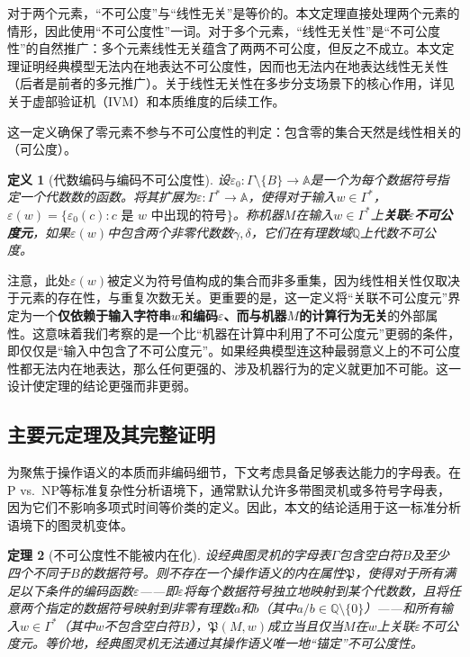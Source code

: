 \documentclass{ctexart}
\newtheorem{theorem}{定理}[section]
\newtheorem{definition}[theorem]{定义}
\begin{document}
	对于两个元素，``不可公度''与``线性无关''是等价的。本文定理直接处理两个元素的情形，因此使用``不可公度性''一词。对于多个元素，``线性无关性''是``不可公度性''的自然推广：多个元素线性无关蕴含了两两不可公度，但反之不成立。本文定理证明经典模型无法内在地表达不可公度性，因而也无法内在地表达线性无关性（后者是前者的多元推广）。关于线性无关性在多步分支场景下的核心作用，详见关于虚部验证机（IVM）和本质维度的后续工作。
	
	这一定义确保了零元素不参与不可公度性的判定：包含零的集合天然是线性相关的（可公度）。
	
	\begin{definition}[代数编码与编码不可公度性]\label{def:encoding}
		设$\varepsilon_0: \Gamma \setminus \{B\} \to \mathbb{A}$是一个为每个数据符号指定一个代数数的函数。将其扩展为$\varepsilon: \Gamma^* \to \mathbb{A}$，使得对于输入$w \in \Gamma^*$，$\varepsilon(w) = \{\varepsilon_0(c) : c \text{ 是 } w \text{ 中出现的符号}\}$。称机器$M$在输入$w \in \Gamma^*$上\textbf{关联$\varepsilon$不可公度元}，如果$\varepsilon(w)$中包含两个非零代数数$\gamma, \delta$，它们在有理数域$\mathbb{Q}$上代数不可公度。
	\end{definition}
	
	注意，此处$\varepsilon(w)$被定义为符号值构成的集合而非多重集，因为线性相关性仅取决于元素的存在性，与重复次数无关。更重要的是，这一定义将``关联不可公度元''界定为一个\textbf{仅依赖于输入字符串$w$和编码$\varepsilon$、而与机器$M$的计算行为无关}的外部属性。这意味着我们考察的是一个比``机器在计算中利用了不可公度元''更弱的条件，即仅仅是``输入中包含了不可公度元''。如果经典模型连这种最弱意义上的不可公度性都无法内在地表达，那么任何更强的、涉及机器行为的定义就更加不可能。这一设计使定理的结论更强而非更弱。
	
	\subsection{主要元定理及其完整证明}
	
	为聚焦于操作语义的本质而非编码细节，下文考虑具备足够表达能力的字母表。在P vs.\ NP等标准复杂性分析语境下，通常默认允许多带图灵机或多符号字母表，因为它们不影响多项式时间等价类的定义。因此，本文的结论适用于这一标准分析语境下的图灵机变体。
	
	\begin{theorem}[不可公度性不能被内在化]\label{thm:main}
		设经典图灵机的字母表$\Gamma$包含空白符$B$及至少四个不同于$B$的数据符号。则不存在一个操作语义的内在属性$\mathfrak{P}$，使得对于所有满足以下条件的编码函数$\varepsilon$——即$\varepsilon$将每个数据符号独立地映射到某个代数数，且将任意两个指定的数据符号映射到非零有理数$a$和$b$（其中$a/b \in \mathbb{Q} \setminus \{0\}$）——和所有输入$w \in \Gamma^*$（其中$w$不包含空白符$B$），$\mathfrak{P}(M, w)$成立当且仅当$M$在$w$上关联$\varepsilon$不可公度元。等价地，经典图灵机无法通过其操作语义唯一地``锚定''不可公度性。
	\end{theorem}
	
\end{document}
